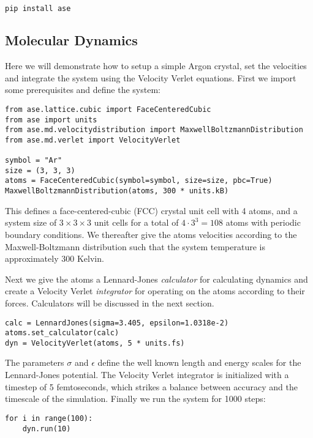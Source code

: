 \begin{lstlisting}[language=bash]
pip install ase
\end{lstlisting}

\subsection{Molecular Dynamics}
Here we will demonstrate how to setup a simple Argon crystal,
set the velocities and integrate the system using
the Velocity Verlet equations.
First we import some prerequisites and define the system:

\begin{verbatim}
from ase.lattice.cubic import FaceCenteredCubic
from ase import units
from ase.md.velocitydistribution import MaxwellBoltzmannDistribution
from ase.md.verlet import VelocityVerlet

symbol = "Ar"
size = (3, 3, 3)
atoms = FaceCenteredCubic(symbol=symbol, size=size, pbc=True)
MaxwellBoltzmannDistribution(atoms, 300 * units.kB)
\end{verbatim}

This defines a face-centered-cubic (FCC) crystal unit cell
with 4 atoms, and a system size of $3\times3\times3$ unit cells
for a total of $4\cdot3^3 = 108$ atoms with periodic boundary conditions.
We thereafter give the atoms velocities according to the
Maxwell-Boltzmann distribution such that the system temperature
is approximately 300 Kelvin.
\par
Next we give the atoms a Lennard-Jones \textit{calculator}
for calculating dynamics and create a Velocity Verlet \textit{integrator}
for operating on the atoms according to their forces.
Calculators will be discussed in the next section.

\begin{verbatim}
calc = LennardJones(sigma=3.405, epsilon=1.0318e-2)
atoms.set_calculator(calc)
dyn = VelocityVerlet(atoms, 5 * units.fs)
\end{verbatim}

The parameters $\sigma$ and $\epsilon$ define the well known
length and energy scales for the Lennard-Jones potential.
The Velocity Verlet integrator is initialized with a timestep
of 5 femtoseconds, which strikes a balance between accuracy
and the timescale of the simulation.
Finally we run the system for 1000 steps:

\begin{verbatim}
for i in range(100):
    dyn.run(10)
\end{verbatim}

